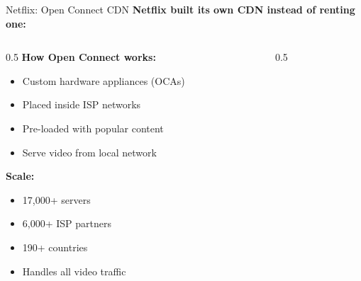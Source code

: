 \documentclass[aspectratio=169,12pt]{beamer}
\begin{document}
\begin{frame}{Netflix: Open Connect CDN}
    \textbf{Netflix built its own CDN instead of renting one:}
    
    \vspace{0.3cm}
    \begin{columns}
        \begin{column}{0.5\textwidth}
            \textbf{How Open Connect works:}
            \begin{itemize}
                \item Custom hardware appliances (OCAs)
                \item Placed inside ISP networks
                \item Pre-loaded with popular content
                \item Serve video from local network
            \end{itemize}
            
            \vspace{0.3cm}
            \textbf{Scale:}
            \begin{itemize}
                \item 17,000+ servers
                \item 6,000+ ISP partners
                \item 190+ countries
                \item Handles all video traffic
            \end{itemize}
        \end{column}
        \begin{column}{0.5\textwidth}
            \begin{center}
\end{center}
\end{column}
\end{columns}
\end{frame}
\end{document}
